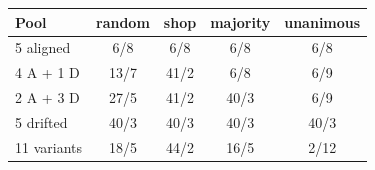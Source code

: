 \begin{tabular}{lcccc}\toprule
Pool & random & shop & majority & unanimous\\\midrule
5 aligned & 6/8 & 6/8 & 6/8 & 6/8\\
4 A + 1 D & 13/7 & 41/2 & 6/8 & 6/9\\
2 A + 3 D & 27/5 & 41/2 & 40/3 & 6/9\\
5 drifted & 40/3 & 40/3 & 40/3 & 40/3\\
11 variants & 18/5 & 44/2 & 16/5 & 2/12\\
\bottomrule\end{tabular}
